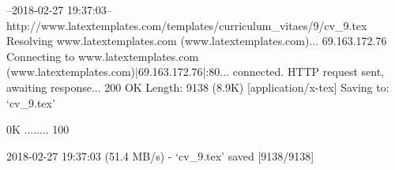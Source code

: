 --2018-02-27 19:37:03--  http://www.latextemplates.com/templates/curriculum_vitaes/9/cv_9.tex
Resolving www.latextemplates.com (www.latextemplates.com)... 69.163.172.76
Connecting to www.latextemplates.com (www.latextemplates.com)|69.163.172.76|:80... connected.
HTTP request sent, awaiting response... 200 OK
Length: 9138 (8.9K) [application/x-tex]
Saving to: ‘cv_9.tex’

     0K ........                                              100%

2018-02-27 19:37:03 (51.4 MB/s) - ‘cv_9.tex’ saved [9138/9138]

